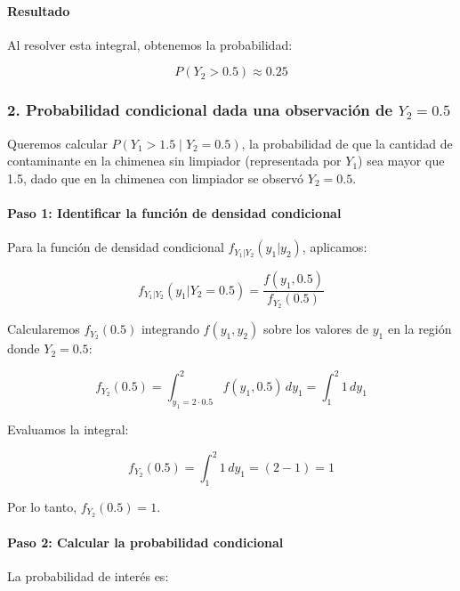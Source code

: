 \documentclass[
]{article}
\begin{document}
\paragraph{Resultado}\label{resultado}

Al resolver esta integral, obtenemos la probabilidad:

\[
P(Y_2 > 0.5) \approx 0.25
\]

\subsubsection{\texorpdfstring{2. Probabilidad condicional dada una observación de \(Y_2 = 0.5\)}{2. Probabilidad condicional dada una observación de Y\_2 = 0.5}}\label{probabilidad-condicional-dada-una-observaciuxf3n-de-y_2-0.5}

Queremos calcular \(P(Y_1 > 1.5 \mid Y_2 = 0.5)\), la probabilidad de que la cantidad de contaminante en la chimenea sin limpiador (representada por \(Y_1\)) sea mayor que 1.5, dado que en la chimenea con limpiador se observó \(Y_2 = 0.5\).

\paragraph{Paso 1: Identificar la función de densidad condicional}\label{paso-1-identificar-la-funciuxf3n-de-densidad-condicional}

Para la función de densidad condicional \(f_{Y_1|Y_2}(y_1 | y_2)\), aplicamos:

\[
f_{Y_1|Y_2}(y_1 | Y_2 = 0.5) = \frac{f(y_1, 0.5)}{f_{Y_2}(0.5)}
\]

Calcularemos \(f_{Y_2}(0.5)\) integrando \(f(y_1, y_2)\) sobre los valores de \(y_1\) en la región donde \(Y_2 = 0.5\):

\[
f_{Y_2}(0.5) = \int_{y_1 = 2 \cdot 0.5}^{2} f(y_1, 0.5) \, dy_1 = \int_{1}^{2} 1 \, dy_1
\]

Evaluamos la integral:

\[
f_{Y_2}(0.5) = \int_{1}^{2} 1 \, dy_1 = (2 - 1) = 1
\]

Por lo tanto, \(f_{Y_2}(0.5) = 1\).

\paragraph{Paso 2: Calcular la probabilidad condicional}\label{paso-2-calcular-la-probabilidad-condicional}

La probabilidad de interés es:
\end{document}
